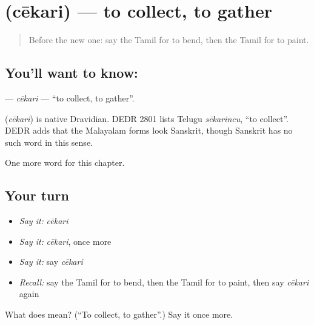 \section[\texorpdfstring{\ta{சேகரி} (cēkari)}{சேகரி (cēkari)}]{ (cēkari) — to collect, to gather}

\label{lesson:TA-C200-cekari}



\begin{quote}
Before the new one: say the Tamil for to bend, then the Tamil for to paint.
\end{quote}

\subsection*{You'll want to know: }
\textbf{} — \emph{cēkari} — \textquotedblleft{}to collect, to gather\textquotedblright{}.

\begin{cousinweb}
\textbf{} (\emph{cēkari}) is native Dravidian. DEDR 2801 lists Telugu \emph{sēkarincu}, \textquotedblleft{}to collect\textquotedblright{}. DEDR adds that the Malayalam forms look Sanskrit, though Sanskrit has no such word in this sense.
\end{cousinweb}

\begin{grammarlens}[title={What you've built}]
One more word for this chapter.
\end{grammarlens}

\subsection*{Your turn}
\begin{itemize}
\raggedright
  \item \emph{Say it:} \emph{cēkari}
  \item \emph{Say it:} \emph{cēkari}, once more
  \item \emph{Say it:} say \emph{cēkari}
  \item \emph{Recall:} say the Tamil for to bend, then the Tamil for to paint, then say \emph{cēkari} again
\end{itemize}

\begin{tcolorbox}[breakable,colback=teal!4,colframe=teal!35!black,title={Before you move on}]
What does  mean? (\textquotedblleft{}To collect, to gather\textquotedblright{}.) Say it once more.
\end{tcolorbox}
